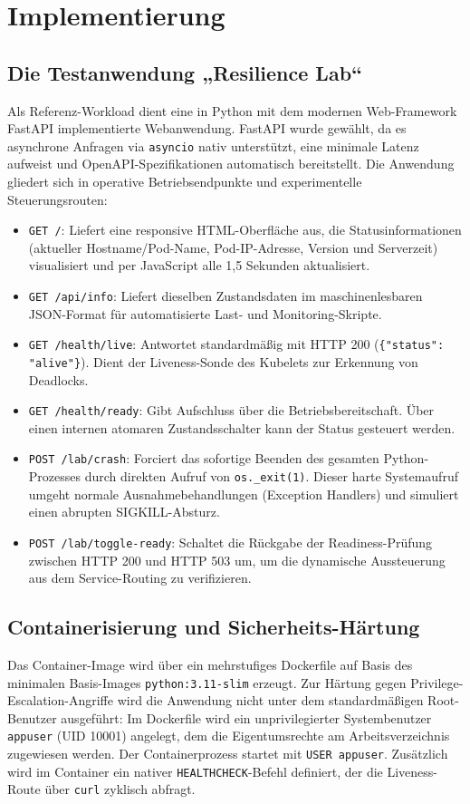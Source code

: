 \chapter{Implementierung}
\label{chap:implementierung}

\section{Die Testanwendung „Resilience Lab“}
\label{sec:demo-anwendung}
Als Referenz-Workload dient eine in Python mit dem modernen Web-Framework FastAPI implementierte Webanwendung. FastAPI wurde gewählt, da es asynchrone Anfragen via \texttt{asyncio} nativ unterstützt, eine minimale Latenz aufweist und OpenAPI-Spezifikationen automatisch bereitstellt. Die Anwendung gliedert sich in operative Betriebsendpunkte und experimentelle Steuerungsrouten:
\begin{itemize}
    \item \texttt{GET /}: Liefert eine responsive HTML-Oberfläche aus, die Statusinformationen (aktueller Hostname/Pod-Name, Pod-IP-Adresse, Version und Serverzeit) visualisiert und per JavaScript alle 1{,}5 Sekunden aktualisiert.
    \item \texttt{GET /api/info}: Liefert dieselben Zustandsdaten im maschinenlesbaren JSON-Format für automatisierte Last- und Monitoring-Skripte.
    \item \texttt{GET /health/live}: Antwortet standardmäßig mit HTTP 200 (\texttt{\{"status": "alive"\}}). Dient der Liveness-Sonde des Kubelets zur Erkennung von Deadlocks.
    \item \texttt{GET /health/ready}: Gibt Aufschluss über die Betriebsbereitschaft. Über einen internen atomaren Zustandsschalter kann der Status gesteuert werden.
    \item \texttt{POST /lab/crash}: Forciert das sofortige Beenden des gesamten Python-Prozesses durch direkten Aufruf von \texttt{os.\_exit(1)}. Dieser harte Systemaufruf umgeht normale Ausnahmebehandlungen (Exception Handlers) und simuliert einen abrupten SIGKILL-Absturz.
    \item \texttt{POST /lab/toggle-ready}: Schaltet die Rückgabe der Readiness-Prüfung zwischen HTTP 200 und HTTP 503 um, um die dynamische Aussteuerung aus dem Service-Routing zu verifizieren.
\end{itemize}

\section{Containerisierung und Sicherheits-Härtung}
\label{sec:containerisierung-haertung}
Das Container-Image wird über ein mehrstufiges Dockerfile auf Basis des minimalen Basis-Images \texttt{python:3.11-slim} erzeugt. Zur Härtung gegen Privilege-Escalation-Angriffe wird die Anwendung nicht unter dem standardmäßigen Root-Benutzer ausgeführt: Im Dockerfile wird ein unprivilegierter Systembenutzer \texttt{appuser} (UID 10001) angelegt, dem die Eigentumsrechte am Arbeitsverzeichnis zugewiesen werden. Der Containerprozess startet mit \texttt{USER appuser}. Zusätzlich wird im Container ein nativer \texttt{HEALTHCHECK}-Befehl definiert, der die Liveness-Route über \texttt{curl} zyklisch abfragt.

